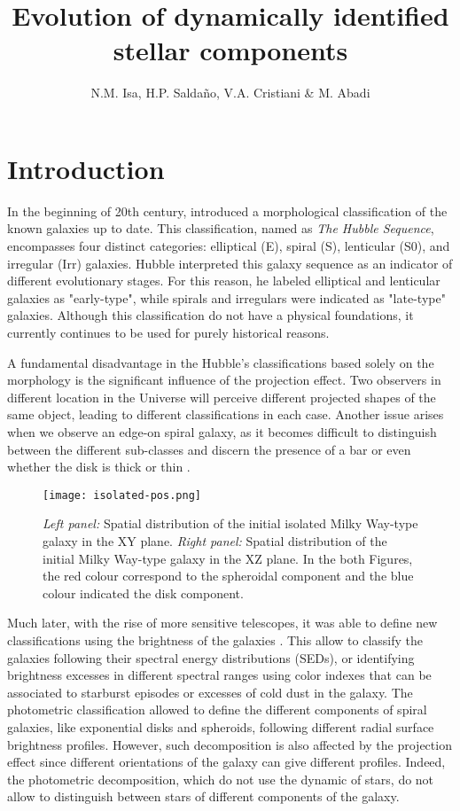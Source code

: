 \documentclass[baaa]{baaa}
\title{Evolution of dynamically identified stellar components}
\author{
N.M. Isa\inst{1},
H.P. Salda\~no\inst{2,3},
V.A. Cristiani\inst{3,4}
\&
M. Abadi\inst{4}
}
\institute{
Facultad de Ciencias Exactas, UNSa, Argentina
\and   
Instituto de Investigaciones en Energ{\'\i}a no Convencional, UNSa, Argentina
\and
Consejo Nacional de Investigaciones Científicas y Técnicas, Argentina
\and
Instituto de Astronomía Teórica y Experimental, CONICET--UNC, Argentina
}
\begin{document}
\maketitle
\section{Introduction}\label{S_intro}

In the beginning of 20th century, \cite{1926ApJ....64..321H,1936rene.book.....H} introduced a morphological classification of the known galaxies up to date. This classification, named as \textit{The Hubble Sequence}, encompasses four distinct categories: elliptical (E), spiral (S), lenticular (S0), and irregular (Irr) galaxies. Hubble interpreted this galaxy sequence as an indicator of different evolutionary stages. For this reason, he labeled elliptical and lenticular galaxies as "early-type", while spirals and irregulars were indicated as "late-type" galaxies. Although this classification do not have a physical foundations, it currently continues to be used for purely historical reasons.

A fundamental disadvantage in the Hubble's classifications based solely on the morphology is the significant influence of the projection effect. Two observers in different location in the Universe will perceive different projected shapes of the same object, leading to different classifications in each case. Another issue arises when we observe an edge-on spiral galaxy, as it becomes difficult to distinguish between the different sub-classes and discern the presence of a bar or even whether the disk is thick or thin \citep{2006}. 

\begin{figure*}[!h]
    \centering
    \texttt{[image: isolated-pos.png]}
    \caption{\emph{Left panel:} Spatial distribution of the initial isolated Milky Way-type galaxy in the XY plane. \emph{Right panel:} Spatial distribution of the initial Milky Way-type galaxy in the XZ plane. In the both Figures, the red colour correspond to the spheroidal component and the blue colour indicated the disk component.}
    \label{Figura1}
\end{figure*}

Much later, with the rise of more sensitive telescopes, it was able to define new classifications using the brightness of the galaxies \citep[e.g., see][]{Sandage_2005ARAA_43_581S}. This allow to classify the galaxies following their spectral energy distributions (SEDs), or identifying brightness excesses in different spectral ranges using color indexes that can be associated to starburst episodes or excesses of cold dust in the galaxy. The photometric classification allowed to define the different components of spiral galaxies, like exponential disks and spheroids, following different radial surface brightness profiles. However, such decomposition is also affected by the projection effect since different orientations of the galaxy can give different profiles. Indeed, the photometric decomposition, which do not use the dynamic of stars, do not allow to distinguish between stars of different components of the galaxy. 
\end{document}
